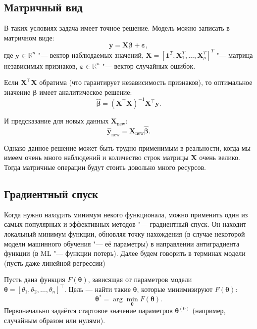 \documentclass[12pt]{article}
\begin{document}
	\subsection{Матричный вид}
	
	В таких условиях задача имеет точное решение. Модель можно записать в матричном виде:
	\[
	\mathbf{y} = \mathbf{X} \boldsymbol{\beta} + \boldsymbol{\varepsilon},
	\]
	где $ \mathbf{y} \in \mathbb{R}^n $ "--- вектор наблюдаемых значений, $\mathbf{X} = [\mathbf{1} ^T, \mathbf{X} ^T _1, \dots, \mathbf{X} ^T _p] ^T$ "--- матрица независимых признаков, $ \boldsymbol{\varepsilon} \in \mathbb{R}^n $ "--- вектор случайных ошибок.
	
	Если $ \mathbf{X}^\top \mathbf{X} $ обратима (что гарантирует независимость признаков), то оптимальное значение $ \boldsymbol{\beta} $ имеет аналитическое решение:
	\[
	\hat{\boldsymbol{\beta}} = (\mathbf{X}^\top \mathbf{X})^{-1} \mathbf{X}^\top \mathbf{y}.
	\]
	
	И предсказание для новых данных $ \mathbf{X}_{\text{new}} $:
	\[
	\hat{\mathbf{y}}_{\text{new}} = \mathbf{X}_{\text{new}} \hat{\boldsymbol{\beta}}.
	\]
	
	Однако данное решение может быть трудно применимым в реальности, когда мы имеем очень много наблюдений и количество строк матрицы $\mathbf{X}$ очень велико. Тогда матричные операции будут стоить довольно много ресурсов.
	
	\subsection{Градиентный спуск}
	
	Когда нужно находить минимум некого функционала, можно применить один из самых популярных и эффективных методов "--- градиентный спуск. Он находит локальный минимум функции, обновляя точку нахождения (в случае некоторой модели машинного обучения "--- её параметры) в направлении антиградиента функции (в ML "--- функции потерь). Далее будем говорить в терминах модели (пусть даже линейной регрессии)
	
	Пусть дана функция $ F(\boldsymbol{\theta}) $, зависящая от параметров модели $ \boldsymbol{\theta} = [\theta_1, \theta_2, \ldots, \theta_n]^\top $. Цель — найти такие $ \boldsymbol{\theta} $, которые минимизируют $ F(\boldsymbol{\theta}) $:
	\[
	\boldsymbol{\theta}^* = \arg \min_{\boldsymbol{\theta}} F(\boldsymbol{\theta}).
	\]
	Первоначально задаётся стартовое значение параметров $ \boldsymbol{\theta}^{(0)} $ (например, случайным образом или нулями).
	
\end{document}
